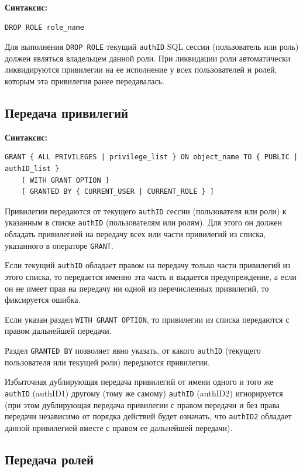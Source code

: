\documentclass[a4paper,12pt]{article}
\begin{document}
\textbf{Синтаксис:}
\begin{verbatim}
DROP ROLE role_name
\end{verbatim}

Для выполнения \texttt{DROP ROLE} текущий \texttt{authID} SQL сессии (пользователь или роль) должен являться владельцем данной роли. При ликвидации роли автоматически ликвидируются привилегии на ее исполнение у всех пользователей и ролей, которым эта привилегия ранее передавалась.

\subsection{Передача привилегий}

\textbf{Синтаксис:}
\begin{verbatim}
GRANT { ALL PRIVILEGES | privilege_list } ON object_name TO { PUBLIC | authID_list }
    [ WITH GRANT OPTION ]
    [ GRANTED BY { CURRENT_USER | CURRENT_ROLE } ]
\end{verbatim}

Привилегии передаются от текущего \texttt{authID} сессии (пользователя или роли) к указанным в списке \texttt{authID} (пользователям или ролям). Для этого он должен обладать привилегией на передачу всех или части привилегий из списка, указанного в операторе \texttt{GRANT}.

Если текущий \texttt{authID} обладает правом на передачу только части привилегий из этого списка, то передается именно эта часть и выдается предупреждение, а если он не имеет прав на передачу ни одной из перечисленных привилегий, то фиксируется ошибка.

Если указан раздел \texttt{WITH GRANT OPTION}, то привилегии из списка передаются с правом дальнейшей передачи.

Раздел \texttt{GRANTED BY} позволяет явно указать, от какого \texttt{authID} (текущего пользователя или текущей роли) передаются привилегии.

Избыточная дублирующая передача привилегий от имени одного и того же \texttt{authID} (authID1) другому (тому же самому) \texttt{authID} (authID2) игнорируется (при этом дублирующая передача привилегии с правом передачи и без права передачи независимо от порядка действий будет означать, что \texttt{authID2} обладает данной привилегией вместе с правом ее дальнейшей передачи).

\subsection{Передача ролей}
\end{document}
